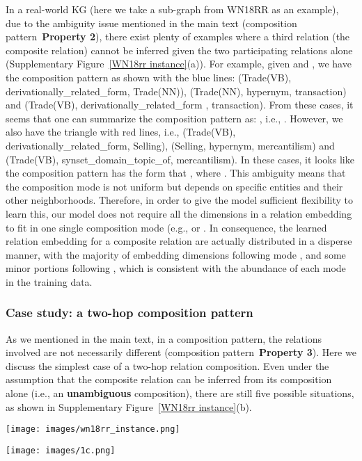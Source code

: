 \documentclass[11pt]{article}
\begin{document}
In a real-world KG (here we take a sub-graph from WN18RR as an example), due to the ambiguity issue mentioned in the main text (composition pattern~\textbf{Property 2}), there exist plenty of examples where a third relation (the composite relation) cannot be inferred given the two participating relations alone (Supplementary Figure~\ref{WN18rr instance}(a)). For example, given  and , we have the composition pattern as shown with the blue lines: (Trade(VB), derivationally\_{related}\_{form}, Trade(NN)), (Trade(NN), hypernym, transaction) and (Trade(VB), derivationally\_{related}\_{form} , transaction). From these cases, it seems that one can summarize the composition pattern as: , i.e., . However, we also have the triangle with red lines, i.e., (Trade(VB), derivationally\_{related}\_{form}, Selling), (Selling, hypernym, mercantilism) and (Trade(VB), synset\_domain\_topic\_of, mercantilism). In these cases, it looks like the composition pattern has the form that , where . This ambiguity means that the composition mode is not uniform but depends on specific entities and their other neighborhoods. Therefore, in order to give the model sufficient flexibility to learn this, our model does not require all the dimensions in a relation embedding to fit in one single composition mode (e.g.,  or . In consequence, the learned relation embedding for a composite relation are actually distributed in a disperse manner, with the majority of embedding dimensions following mode , and some minor portions following , which is consistent with the abundance of each mode in the training data.

\subsubsection{Case study: a two-hop composition pattern}

As we mentioned in the main text, in a composition pattern, the relations involved are not necessarily different (composition pattern~\textbf{Property 3}). Here we discuss the simplest case of a two-hop relation composition. Even under the assumption that the composite relation can be inferred from its composition alone (i.e., an \textbf{unambiguous} composition), there are still five possible situations, as shown in Supplementary Figure~\ref{WN18rr instance}(b).  




\begin{figure*}[htbp]
\centering
\begin{minipage}{10cm}
\centering
\texttt{[image: images/wn18rr\_instance.png]}
\subcaption{}
\end{minipage}


\begin{minipage}{8cm}
\centering
\texttt{[image: images/1c.png]}
\subcaption{}
\end{minipage}
\caption{(a) A representative subgraph from WN18RR to show ambiguity. (b) The relations involved in a composition pattern are not necessarily to be mutually different.}
\label{WN18rr instance}
\end{figure*}
\end{document}
